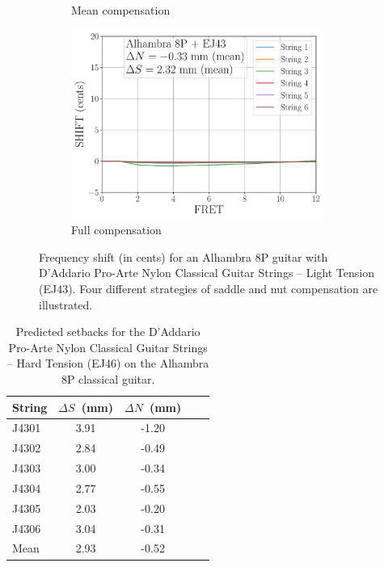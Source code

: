 \begin{figure}
\begin{subfigure}[b]{0.45\textwidth}
   \caption{Mean compensation}
   \label{fig:shift_alhambra8p_ej43_mean}
  \end{subfigure}
  \hspace{0.25in}
  \begin{subfigure}[b]{0.45\textwidth}
   \centering
   \includegraphics[width=3.25in]{figures/shift_alhambra8p_ej43_full}
   \caption{Full compensation}
   \label{fig:shift_alhambra8p_ej43_full}
  \end{subfigure}
  \caption{\label{fig:compensation} Frequency shift (in cents) for an Alhambra 8P guitar with D'Addario Pro-Arte Nylon Classical Guitar Strings -- Light Tension (EJ43). Four different strategies of saddle and nut compensation are illustrated.}
 \end{figure}


\begin{table}%
  \centering
  \caption{\label{tbl:ej43_setbacks} Predicted setbacks for the D'Addario Pro-Arte Nylon Classical Guitar Strings -- Hard Tension (EJ46) on the Alhambra 8P classical guitar.}
    \begin{tabular}{lcccc}
    \hline \hline
    String  & $\Delta S$~(mm) & $\Delta N$~(mm) \\
    \hline
    J4301 & 3.91 & -1.20 \\
    J4302 & 2.84 & -0.49 \\
    J4303 & 3.00 & -0.34 \\
    J4304 & 2.77 & -0.55 \\
    J4305 & 2.03 & -0.20 \\
    J4306 & 3.04 & -0.31 \\
    \hline \hline
    Mean & 2.93 & -0.52 \\
    \hline
    \end{tabular}%
  \label{tab:addlabel}%
\end{table}%


